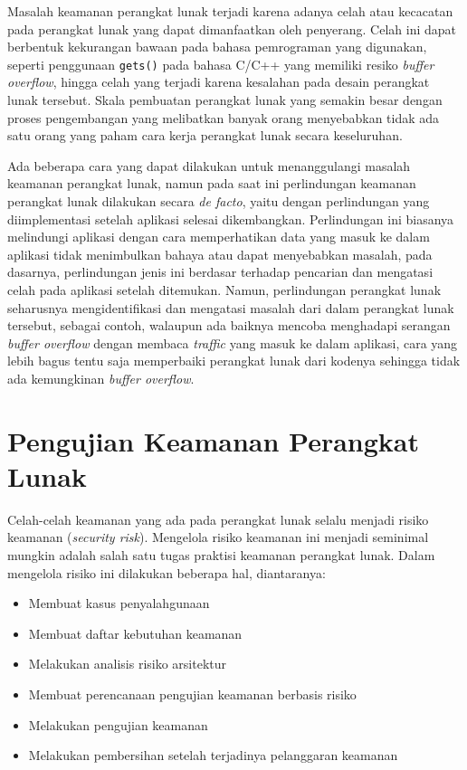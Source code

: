Masalah keamanan perangkat lunak terjadi karena adanya celah atau kecacatan pada perangkat lunak yang dapat
dimanfaatkan oleh penyerang. Celah ini dapat berbentuk kekurangan bawaan pada bahasa pemrograman yang digunakan,
seperti penggunaan \texttt{gets()} pada bahasa C/C++ yang memiliki resiko \textit{buffer overflow},
hingga celah yang terjadi
karena kesalahan pada desain perangkat lunak tersebut. Skala pembuatan perangkat lunak yang semakin besar
dengan proses pengembangan yang melibatkan banyak orang menyebabkan tidak ada satu orang yang paham
cara kerja perangkat lunak secara keseluruhan.

Ada beberapa cara yang dapat dilakukan untuk menanggulangi masalah keamanan perangkat lunak,
namun pada saat ini perlindungan keamanan perangkat lunak dilakukan secara \textit{de facto},
yaitu dengan perlindungan yang diimplementasi setelah aplikasi selesai dikembangkan.
Perlindungan ini biasanya melindungi aplikasi dengan cara memperhatikan data yang masuk
ke dalam aplikasi tidak menimbulkan bahaya atau dapat menyebabkan masalah, pada dasarnya,
perlindungan jenis ini berdasar terhadap pencarian dan mengatasi celah pada aplikasi setelah ditemukan.
Namun, perlindungan perangkat lunak seharusnya mengidentifikasi dan mengatasi masalah dari
dalam perangkat lunak tersebut, sebagai contoh, walaupun ada baiknya mencoba menghadapi serangan
\textit{buffer overflow} dengan membaca \textit{traffic} yang masuk ke dalam aplikasi,
cara yang lebih bagus tentu saja memperbaiki perangkat lunak dari kodenya sehingga
tidak ada kemungkinan \textit{buffer overflow}.

\section{Pengujian Keamanan Perangkat Lunak}

Celah-celah keamanan yang ada pada perangkat lunak selalu menjadi risiko keamanan (\textit{security risk}).
Mengelola risiko keamanan ini menjadi seminimal mungkin adalah salah satu tugas praktisi keamanan perangkat lunak.
Dalam mengelola risiko ini dilakukan beberapa hal, diantaranya:

\begin{itemize}
    \item Membuat kasus penyalahgunaan
    \item Membuat daftar kebutuhan keamanan
    \item Melakukan analisis risiko arsitektur
    \item Membuat perencanaan pengujian keamanan berbasis risiko
    \item Melakukan pengujian keamanan
    \item Melakukan pembersihan setelah terjadinya pelanggaran keamanan
\end{itemize}

